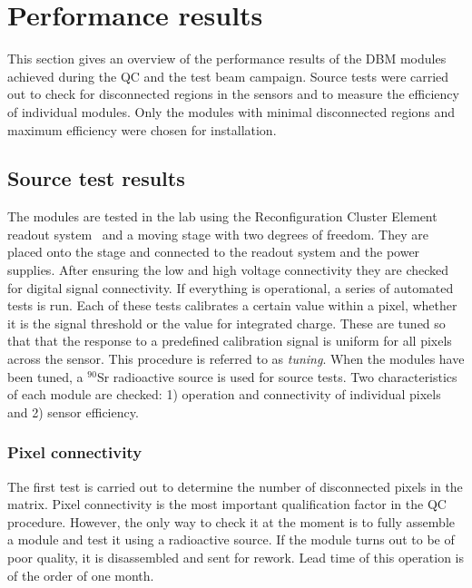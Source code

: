 \section{Performance results}
\label{sec:perfresults}
This section gives an overview of the performance results of the DBM modules achieved during the QC and the test beam campaign. Source tests were carried out to check for disconnected regions in the sensors and to measure the efficiency of individual modules. Only the modules with minimal disconnected regions and maximum efficiency were chosen for installation. 


\subsection{Source test results}
The modules are tested in the lab using the Reconfiguration Cluster Element readout system~\cite{Claus:2021543} and a moving stage with two degrees of freedom. They are placed onto the stage and connected to the readout system and the power supplies. After ensuring the low and high voltage connectivity they are checked for digital signal connectivity. If everything is operational, a series of automated tests is run. Each of these tests calibrates a certain value within a pixel, whether it is the signal threshold or the value for integrated charge. These are tuned so that that the response to a predefined calibration signal is uniform for all pixels across the sensor. This procedure is referred to as \emph{tuning}. When the modules have been tuned, a $^{90}$Sr radioactive source is used for source tests. Two characteristics of each module are checked: 1) operation and connectivity of individual pixels and 2) sensor efficiency. 

\subsubsection{Pixel connectivity}
The first test is carried out to determine the number of disconnected pixels in the matrix.
Pixel connectivity is the most important qualification factor in the QC procedure. However, the only way to check it at the moment is to fully assemble a module and test it using a radioactive source. If the module turns out to be of poor quality, it is disassembled and sent for rework. Lead time of this operation is of the order of one month.

